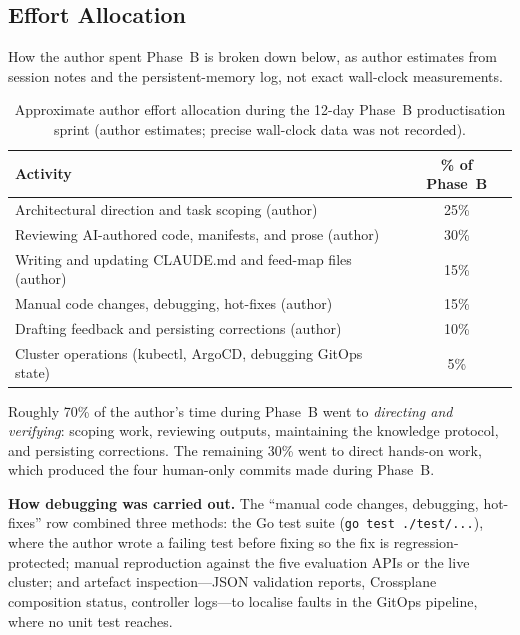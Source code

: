 \subsection{Effort Allocation}
\label{subsec:effort-allocation}

How the author spent Phase~B is broken down below, as author estimates from session notes and the persistent-memory log, not exact wall-clock measurements.

\begin{table}[htbp]
\centering
\caption{Approximate author effort allocation during the 12-day Phase~B productisation sprint (author estimates; precise wall-clock data was not recorded).}
\label{tab:effort-allocation}
\small
\begin{tabular}{@{}p{} c@{}}
\toprule
\textbf{Activity} & \textbf{\% of Phase~B} \\
\midrule
Architectural direction and task scoping (author) & 25\% \\
Reviewing AI-authored code, manifests, and prose (author) & 30\% \\
Writing and updating CLAUDE.md and feed-map files (author) & 15\% \\
Manual code changes, debugging, hot-fixes (author) & 15\% \\
Drafting feedback and persisting corrections (author) & 10\% \\
Cluster operations (kubectl, ArgoCD, debugging GitOps state) & 5\% \\
\bottomrule
\end{tabular}
\end{table}

Roughly 70\% of the author's time during Phase~B went to \emph{directing and verifying}: scoping work, reviewing outputs, maintaining the knowledge protocol, and persisting corrections. The remaining 30\% went to direct hands-on work, which produced the four human-only commits made during Phase~B.

\textbf{How debugging was carried out.} The ``manual code changes, debugging, hot-fixes'' row combined three methods: the Go test suite (\texttt{go test ./test/...}), where the author wrote a failing test before fixing so the fix is regression-protected; manual reproduction against the five evaluation APIs or the live cluster; and artefact inspection---JSON validation reports, Crossplane composition status, controller logs---to localise faults in the GitOps pipeline, where no unit test reaches.

